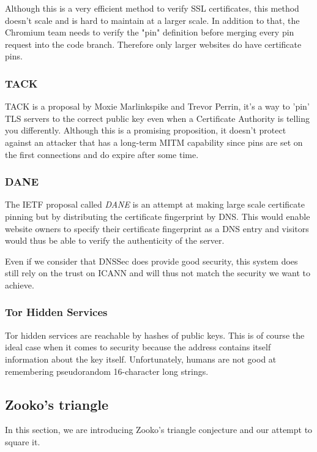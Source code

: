 \documentclass{vldb}
\begin{document}
Although this is a very efficient method to verify SSL certificates, this method doesn't scale and is hard to maintain at a larger scale. In addition to that, the Chromium team needs to verify the "pin" definition before merging every pin request into the code branch. Therefore only larger websites do have certificate pins.

\subsubsection{TACK}

TACK is a proposal by Moxie Marlinkspike and Trevor Perrin, it's a way to 'pin' TLS servers to the correct public key even when a Certificate Authority is telling you differently. Although this is a promising proposition, it doesn't protect against an attacker that has a long-term MITM capability since pins are set on the first connections and do expire after some time.\cite{tackMITM}

\subsubsection{DANE}

The IETF proposal called \emph{DANE} is an attempt at making large scale certificate pinning but by distributing the certificate fingerprint by DNS. This would enable website owners to specify their certificate fingerprint as a DNS entry and visitors would thus be able to verify the authenticity of the server.

Even if we consider that DNSSec does provide good security, this system does still rely on the trust on ICANN and will thus not match the security we want to achieve.

\subsubsection{Tor Hidden Services}

Tor hidden services are reachable by hashes of public keys. This is of course the ideal case when it comes to security because the address contains itself information about the key itself. Unfortunately, humans are not good at remembering pseudorandom 16-character long strings.

\subsection{Zooko's triangle}
In this section, we are introducing Zooko's triangle conjecture and our attempt to square it.
\end{document}
